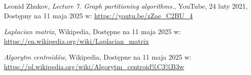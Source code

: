 \documentclass{article}
\begin{document}
    

\begin{thebibliography}{9}

Leonid Zhukov, \textit{Lecture 7. Graph partitioning algorithms.}, YouTube, 24 luty 2021, Dostępny na 11 maja 2025 w: \url{https://youtu.be/zZae_C2BU_4}

\textit{Laplacian matrix}, Wikipedia, Dostępne na 11 maja 2025 w: \url{https://en.wikipedia.org/wiki/Laplacian_matrix}

\textit{Algorytm centroidów}, Wikipedia, Dostępne na 11 maja 2025 w:
\url{https://pl.wikipedia.org/wiki/Algorytm_centroid%C3%B3w}

\end{thebibliography}
\end{document}
